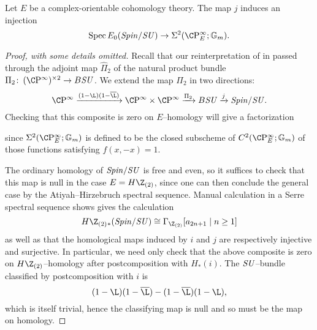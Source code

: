 \begin{lemma}\label{SpinSUComparisonMapIsInj}
Let \(E\) be a complex-orientable cohomology theory.  The map \(j\) induces an injection \[\Spec E_0(\Spin/\SU) \to \Sigma^2(\CP^\infty_E; \Gm).\]
\end{lemma}
\begin{proof}[Proof, with some details omitted]
Recall that our reinterpretation of  in  passed through the adjoint map \(\widehat \Pi_2\) of the natural product bundle \(\Pi_2\co (\CP^\infty)^{\times 2} \to B\SU\).  We extend the map \(\Pi_2\) in two directions: \[\CP^\infty \xrightarrow{(1 - \L)(1 - \overline{\L})} \CP^\infty \times \CP^\infty \xrightarrow{\Pi_2} B\SU \xrightarrow{j} \Spin/\SU.\]  Checking that this composite is zero on \(E\)--homology will give a factorization
\begin{center}
\end{center}
since \(\Sigma^2(\CP^\infty_E; \Gm)\) is defined to be the closed subscheme of \(C^2(\CP^\infty_E; \Gm)\) of those functions satisfying \(f(x, -x) = 1\).

The ordinary homology of \(\mathit{Spin}/\mathit{SU}\) is free and even, so it suffices to check that this map is null in the case \(E = H\Z_{(2)}\), since one can then conclude the general case by the Atiyah--Hirzebruch spectral sequence.  Manual calculation in a Serre spectral sequence shows gives the calculation \[H\Z_{(2)}{}_*(\Spin/\SU) \cong \Gamma_{\Z_{(2)}}[a_{2n+1} \mid n \ge 1]\] as well as that the homological maps induced by \(i\) and \(j\) are respectively injective and surjective.  In particular, we need only check that the above composite is zero on \(H\Z_{(2)}\)--homology after postcomposition with \(H_*(i)\).  The \(\mathit{SU}\)--bundle classified by postcomposition with \(i\) is \[(1 - \L)(1 - \overline \L) - (1 - \overline \L)(1 - \L),\] which is itself trivial, hence the classifying map is null and so must be the map on homology.


\end{proof}
